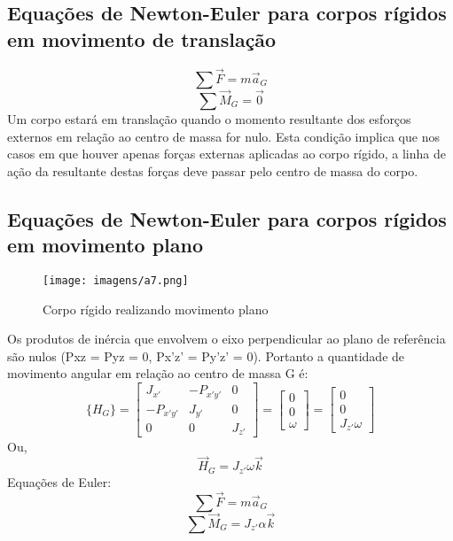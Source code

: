 \documentclass[a4paper, 12pt]{article}
\begin{document}
	\subsection{Equações de Newton-Euler para corpos rígidos em movimento de translação}
		\begin{equation}
			\sum \vec{F} = m\vec{a}_G
		\end{equation}
		\begin{equation}
			\sum \vec{M}_G = \vec{0}
		\end{equation}
		Um corpo estará em translação quando o momento resultante dos esforços externos em relação ao centro de massa for nulo. Esta condição implica que nos casos em que houver apenas forças externas aplicadas ao corpo rígido, a linha de ação da resultante destas forças deve passar pelo centro de massa do corpo.
	
	\subsection{Equações de Newton-Euler para corpos rígidos em movimento plano}
		\begin{figure}[h]
			\center
			\texttt{[image: imagens/a7.png]} 
			\caption{Corpo rígido realizando movimento plano}
		\end{figure}	
		Os produtos de inércia que envolvem o eixo perpendicular ao plano de referência são nulos (Pxz = Pyz = 0, Px’z’ = Py’z’ = 0). Portanto a quantidade de movimento angular em relação ao centro de massa G é:
		\begin{equation}
			\{H_G\} = \begin{bmatrix}
			J_{x'} & -P_{x'y'} &0\\
			-P_{x'y'} & J_{y'} & 0\\
			0 & 0 & J_{z'}
			\end{bmatrix} = \begin{bmatrix}
			0\\0\\ \omega
			\end{bmatrix} = \begin{bmatrix}
			0\\0\\J_{z'}\omega
			\end{bmatrix}
		\end{equation}
		Ou,
		\begin{equation}
			\vec{H}_G = J_{z'}\omega \vec{k}
		\end{equation}
		Equações de Euler:
		\begin{equation}
			\sum\vec{F} = m\vec{a}_G
		\end{equation}
		\begin{equation}
			\sum\vec{M}_G = J_{z'}\alpha \vec{k}
		\end{equation}
\end{document}
